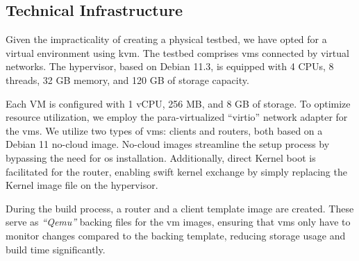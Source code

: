 \subsection{Technical Infrastructure} %
\label{sub:Technical Infrastructure}
Given the impracticality of creating a physical testbed, we have opted for a 
    virtual environment using \gls{kvm}.
The testbed comprises \glspl{vm} connected by virtual networks.
The hypervisor, based on Debian 11.3, is equipped with 4 CPUs, 8 threads, 32 GB
    memory, and 120 GB of storage capacity.

Each VM is configured with 1 vCPU, 256 MB, and 8 GB of storage.
To optimize resource utilization, we employ the para-virtualized ``virtio''
    network adapter for the \glspl{vm}.
We utilize two types of \glspl{vm}: clients and routers, both based on a Debian
    11 no-cloud image.
No-cloud images streamline the setup process by bypassing the need for \gls{os}
    installation.
Additionally, direct Kernel boot is facilitated for the router, enabling swift
    kernel exchange by simply replacing the Kernel image file on the
    hypervisor.

During the build process, a router and a client template image are created.
These serve as \textit{``Qemu''} backing files for the \gls{vm} images,
    ensuring that \glspl{vm} only have to monitor changes compared to the
    backing template, reducing storage usage and build time significantly.

